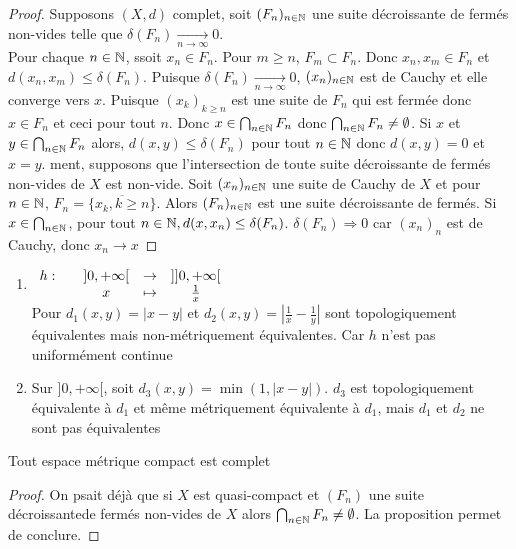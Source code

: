 \documentclass[]{report}
\begin{document}
    \begin{proof}
        Supposons $(X,d)$ complet, soit $(F_n)_{n\in\mathbb{N}}$ une suite décroissante de fermés non-vides telle que $\delta(F_n)\underset{n\to\infty}{\longrightarrow} 0$.\\
        Pour chaque ${n\in\mathbb{N}}$, ssoit $x_n\in F_n$. Pour $m\ge n$, $F_m\subset F_n$. Donc $x_n,x_m\in F_n$ et $d(x_n,x_m)\le \delta (F_n)$. Puisque $\delta(F_n)\underset{n\to\infty}{\longrightarrow} 0$, $(x_n)_{n\in\mathbb{N}}$ est de Cauchy et elle converge vers $x$. Puisque $(x_k)_{k\ge n}$ est une suite de $F_n$ qui est fermée donc $x\in F_n$ et ceci pour tout $n$. Donc $x\in \bigcap_{{n\in\mathbb{N}}}F_n$ donc $\bigcap_{n\in\mathbb{N}} F_n\neq \emptyset$. Si $x$ et $y\in \bigcap_{{n\in\mathbb{N}}} F_n$ alors, $d(x,y)\le \delta(F_n)$ pour tout ${n\in\mathbb{N}}$ donc $d(x,y)=0$ et $x=y$. ment, supposons que l'intersection de toute suite décroissante de fermés non-vides de $X$ est non-vide. Soit $(x_n)_{n\in\mathbb{N}}$ une suite de Cauchy de $X$ et pour ${n\in\mathbb{N}}$, $F_n=\overline{\{x_k,k\ge n\}}$. Alors $(F_n)_{n\in\mathbb{N}}$ est une suite décroissante de fermés. Si $x\in \bigcap_{{n\in\mathbb{N}}}$, pour tout ${n\in\mathbb{N}},d(x,x_n)\le\delta(F_n)$. $\delta(F_n)\Longrightarrow 0$ car $(x_n)_n$ est de Cauchy, donc $x_n\longrightarrow x$
    \end{proof}

    \begin{ex}{}{}
        \begin{enumerate}
            \item $\begin{array}{ccccc} h : & & ]0,+\infty[ & \to & ]]0,+\infty[ \\ & & x & \mapsto & \frac{1}{x} \end{array}$\\
            Pour $d_1(x,y)=|x-y|$ et $d_2(x,y)=|\frac{1}{x}-\frac{1}{y}|$ sont topologiquement équivalentes mais non-métriquement équivalentes. Car $h$ n'est pas uniformément continue
            \item Sur $]0,+\infty[$, soit $d_3(x,y)=\min(1,|x-y|)$. $d_3$ est topologiquement équivalente à $d_1$ et même métriquement équivalente à $d_1$, mais $d_1$ et $d_2$ ne sont pas équivalentes
        \end{enumerate}
    \end{ex}

    \begin{tm}{}{}
        Tout espace métrique compact est complet
    \end{tm}

    \begin{proof}
        On psait déjà que si $X$ est quasi-compact et $(F_n)$ une suite décroissantede fermés non-vides de $X$ alors $\bigcap_{n\in \mathbb{N}}F_n\neq \emptyset$. La proposition permet de conclure.
    \end{proof}
\end{document}
